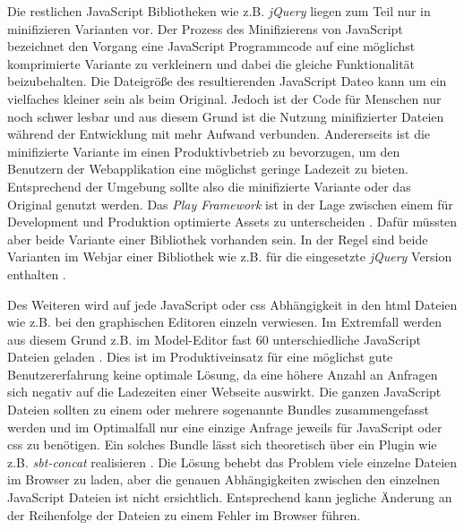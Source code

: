 Die restlichen JavaScript Bibliotheken wie z.B. \textit{jQuery} liegen zum Teil nur in minifizieren Varianten vor. Der Prozess des Minifizierens von JavaScript bezeichnet den Vorgang eine JavaScript Programmcode auf eine möglichst komprimierte Variante zu verkleinern und dabei die gleiche Funktionalität beizubehalten. Die Dateigröße des resultierenden JavaScript Dateo kann um ein vielfaches kleiner sein als beim Original. Jedoch ist der Code für Menschen nur noch schwer lesbar und aus diesem Grund ist die Nutzung minifizierter Dateien während der Entwicklung mit mehr Aufwand verbunden. Andererseits ist die minifizierte Variante im einen Produktivbetrieb zu bevorzugen, um den Benutzern der Webapplikation eine möglichst geringe Ladezeit zu bieten. Entsprechend der Umgebung sollte also die minifizierte Variante oder das Original genutzt werden. Das \textit{Play Framework} ist in der Lage zwischen einem für Development und Produktion optimierte Assets zu unterscheiden \cite{play_assets_min}. Dafür müssten aber beide Variante einer Bibliothek vorhanden sein. In der Regel sind beide Varianten im Webjar einer Bibliothek wie z.B. für die eingesetzte \textit{jQuery} Version enthalten \cite{webjar_jquery_files}. 

Des Weiteren wird auf jede JavaScript oder \ac{css} Abhängigkeit in den \ac{html} Dateien wie z.B. bei den graphischen Editoren einzeln verwiesen. Im Extremfall werden aus diesem Grund z.B. im Model-Editor fast 60 unterschiedliche JavaScript Dateien geladen \cite{zeta_model_graphical}. Dies ist im Produktiveinsatz für eine möglichst gute Benutzererfahrung keine optimale Lösung, da eine höhere Anzahl an Anfragen sich negativ auf die Ladezeiten einer Webseite auswirkt. Die ganzen JavaScript Dateien sollten zu einem oder mehrere sogenannte Bundles zusammengefasst werden und im Optimalfall nur eine einzige Anfrage jeweils für JavaScript oder \ac{css} zu benötigen. Ein solches Bundle lässt sich theoretisch über ein Plugin wie z.B. \textit{sbt-concat} realisieren \cite{sbt_concat}. Die Lösung behebt das Problem viele einzelne Dateien im Browser zu laden, aber die genauen Abhängigkeiten zwischen den einzelnen JavaScript Dateien ist nicht ersichtlich. Entsprechend kann jegliche Änderung an der Reihenfolge der Dateien zu einem Fehler im Browser führen.

